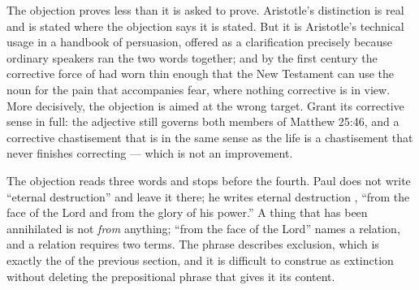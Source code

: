 The  objection proves less than it is asked to prove. Aristotle's distinction is real and is stated where the objection says it is stated. But it is Aristotle's technical usage in a handbook of persuasion, offered as a clarification precisely because ordinary speakers ran the two words together; and by the first century the corrective force of  had worn thin enough that the New Testament can use the noun for the pain that accompanies fear, where nothing corrective is in view. More decisively, the objection is aimed at the wrong target. Grant  its corrective sense in full: the adjective still governs both members of Matthew 25:46, and a corrective chastisement that is  in the same sense as the life is a chastisement that never finishes correcting --- which is not an improvement.

The  objection reads three words and stops before the fourth. Paul does not write ``eternal destruction'' and leave it there; he writes eternal destruction , ``from the face of the Lord and from the glory of his power.'' A thing that has been annihilated is not \emph{from} anything; ``from the face of the Lord'' names a relation, and a relation requires two terms. The phrase describes exclusion, which is exactly the  of the previous section, and it is difficult to construe as extinction without deleting the prepositional phrase that gives it its content.

